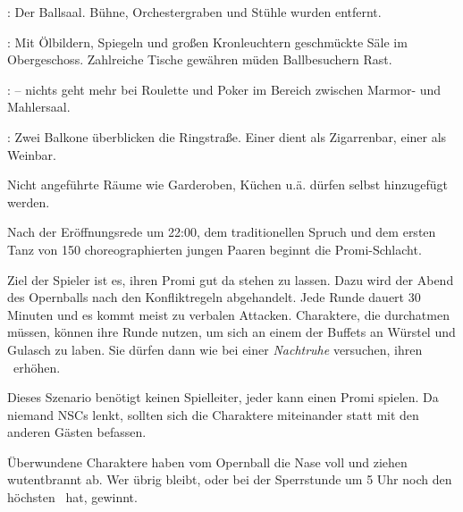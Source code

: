 {		: Der Ballsaal. Bühne, Orchestergraben und  Stühle wurden entfernt.

		: Mit Ölbildern, Spiegeln und großen Kronleuchtern geschmückte Säle im Obergeschoss. Zahlreiche Tische gewähren müden Ballbesuchern Rast.

		:  -- nichts geht mehr bei Roulette und Poker im Bereich zwischen Marmor- und Mahlersaal.

		: Zwei Balkone überblicken die Ringstraße. Einer dient als Zigarrenbar, einer als Weinbar.

		Nicht angeführte Räume wie Garderoben, Küchen u.ä. dürfen selbst hinzugefügt werden.


		\noindent
		Nach der Eröffnungsrede um 22:00, dem traditionellen Spruch  und dem ersten Tanz von 150 choreographierten jungen Paaren beginnt die Promi-Schlacht.

		Ziel der Spieler ist es, ihren Promi gut da stehen zu lassen. Dazu wird der Abend des Opernballs nach den Konfliktregeln abgehandelt. Jede Runde dauert 30 Minuten und es kommt meist zu verbalen Attacken. Charaktere, die durchatmen müssen, können ihre Runde nutzen, um sich an einem der Buffets an Würstel und Gulasch zu laben. Sie dürfen dann wie bei einer \emph{Nachtruhe} versuchen, ihren \HD~erhöhen.

		Dieses Szenario benötigt keinen Spielleiter, jeder kann einen Promi spielen. Da niemand NSCs lenkt, sollten sich die Charaktere miteinander statt mit den anderen Gästen befassen.

		Überwundene Charaktere haben vom Opernball die Nase voll und ziehen wutentbrannt ab. Wer übrig bleibt, oder bei der Sperrstunde um 5 Uhr noch den höchsten \HD~hat, gewinnt.
}

